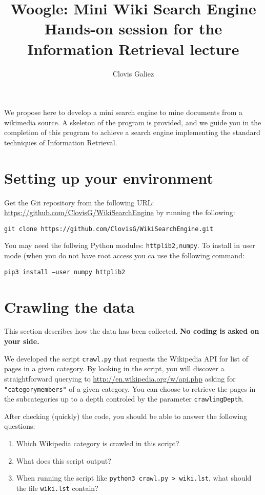 \documentclass[mathserif, 11pt,c]{article}
\title{Woogle: Mini Wiki Search Engine\\
\Large Hands-on session for the Information Retrieval lecture}
\author{Clovis Galiez}
\begin{document}
\setcounter{secnumdepth}{1} 

\newcommand{\normtwo}[1]{\left|\left|#1\right|\right|_2} 
\newcommand{\normmat}[1]{\left|\left|\left|#1\right|\right|\right|} 
\newcommand{\n}[1]{\lVert #1 \rVert} 
\newcommand{\myd}[2]{ 2\log{\dfrac{\n{#1}.\n{#2}}{#1\cdot #2}}}

\maketitle


We propose here to develop a mini search engine to mine documents from a wikimedia source. A skeleton of the program is provided, and we guide you in the completion of this program to achieve a search engine implementing the standard techniques of Information Retrieval.


\section{Setting up your environment}

Get the Git repository from the following URL: \url{https://github.com/ClovisG/WikiSearchEngine} by running the following:

\texttt{git clone https://github.com/ClovisG/WikiSearchEngine.git}

You may need the follwing Python modules: \texttt{httplib2,numpy}. To install in user mode (when you do not have root access you ca use the following command:

\texttt{pip3 install --user numpy httplib2}

\section{Crawling the data}



This section describes how the data has been collected. \textbf{No coding is asked on your side.}

We developed the script \texttt{crawl.py} that requests the Wikipedia API for list of pages in a given category. By looking in the script, you will discover a straightforward querying to \url{http://en.wikipedia.org/w/api.php} asking for \texttt{"categorymembers"} of a given category. You can choose to retrieve the pages in the subcategories up to a depth controled by the parameter \texttt{crawlingDepth}.


After checking (quickly) the code, you should be able to answer the following questions:
\begin{enumerate}[label=\textbf{Q\thesection.\arabic*}]
	\item Which Wikipedia category is crawled in this script?
	\item What does this script output?
	\item When running the script like \texttt{python3 crawl.py > wiki.lst}, what should the file \texttt{wiki.lst} contain?
\end{enumerate}
\end{document}
